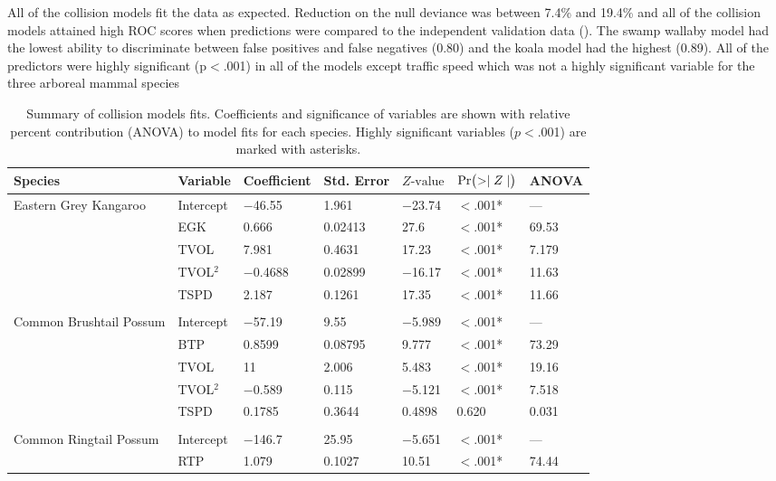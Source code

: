 All of the collision models fit the data as expected.  Reduction on the null deviance was between 7.4\% and 19.4\% and all of the collision models attained high ROC scores when predictions were compared to the independent validation data ().  The swamp wallaby model had the lowest ability to discriminate between false positives and false negatives (0.80) and the koala model had the highest (0.89). All of the predictors were highly significant (p$<$.001) in all of the models except traffic speed which was not a highly significant variable for the three arboreal mammal species

\begin{table}[!t]
\caption[Summary of collision models for six mammal species]{Summary of collision models fits. Coefficients and significance of variables are shown with relative percent contribution (ANOVA) to model fits for each species.  Highly significant variables ($p<$.001) are marked with asterisks.}
\centering
\begin{tabularx}{0.9\textwidth}{lllllll} \toprule
Species & Variable & Coefficient & Std. Error & $Z\text{-value}$ & $\text{Pr}\bigl( >\mid Z \mid \bigr)$ & ANOVA \\ 
\midrule
Eastern Grey Kangaroo & Intercept & $-$46.55 & 1.961 & $-$23.74 & $<$.001* & --- \\ 
   & EGK & 0.666 & 0.02413 & 27.6 & $<$.001* & 69.53 \\ 
   & TVOL & 7.981 & 0.4631 & 17.23 & $<$.001* & 7.179 \\ 
   & TVOL$^2$ & $-$0.4688 & 0.02899 & $-$16.17 & $<$.001* & 11.63 \\ 
   & TSPD & 2.187 & 0.1261 & 17.35 & $<$.001* & 11.66 \\ 
   &  &  &  &  &  &  \\ 
Common Brushtail Possum & Intercept & $-$57.19 & 9.55 & $-$5.989 & $<$.001* & --- \\ 
   & BTP & 0.8599 & 0.08795 & 9.777 & $<$.001* & 73.29 \\ 
   & TVOL & 11 & 2.006 & 5.483 & $<$.001* & 19.16 \\ 
   & TVOL$^2$ & $-$0.589 & 0.115 & $-$5.121 & $<$.001* & 7.518 \\ 
   & TSPD & 0.1785 & 0.3644 & 0.4898 & 0.620 & 0.031 \\ 
   &  &  &  &  &  &  \\ 
Common Ringtail Possum & Intercept & $-$146.7 & 25.95 & $-$5.651 & $<$.001* & --- \\ 
   & RTP & 1.079 & 0.1027 & 10.51 & $<$.001* & 74.44 \\ 

\end{tabularx}
\end{table}
